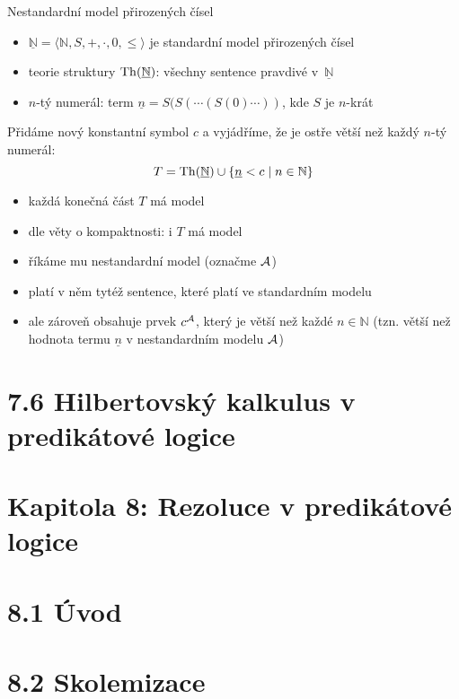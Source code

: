 \documentclass{beamer}
\begin{document}
\begin{frame}{Nestandardní model přirozených čísel}

    \begin{itemize}
        \item $\underline{\mathbb N}=\langle\mathbb N,S,+,\cdot,0,\leq\rangle$ je \alert{standardní model} přirozených čísel
        \item \alert{teorie struktury $\operatorname{Th}(\underline{\mathbb N})$:} všechny sentence \alert{pravdivé} v~$\underline{\mathbb N}$
        \item \alert{$n$-tý numerál:} term $\underline n=S(S(\cdots (S(0)\cdots))$, kde $S$ je $n$-krát
    \end{itemize}
    
    Přidáme nový konstantní symbol $c$ a vyjádříme, že je ostře větší než každý $n$-tý numerál:
    $$
    T=\operatorname{Th}(\underline{\mathbb N})\cup\{\underline n<c\mid n\in \mathbb N\}
    $$
        
    \begin{itemize}
        \item každá konečná část $T$ má model
        \item dle věty o kompaktnosti: i $T$ má model
        \item říkáme mu \alert{nestandardní model} (označme $\mathcal{A}$)
        \item platí v něm tytéž sentence, které platí ve standardním modelu
        \item ale zároveň obsahuje prvek $c^{\mathcal{A}}$, který je větší než každé $n\in \mathbb N$ (tzn. větší než hodnota termu $\underline n$ v nestandardním modelu $\mathcal{A}$)
    \end{itemize}    

\end{frame}


\section{7.6 Hilbertovský kalkulus v predikátové logice}





\section{\sc Kapitola 8: Rezoluce v predikátové logice}


\section{8.1 Úvod}


\section{8.2 Skolemizace}
\end{document}
